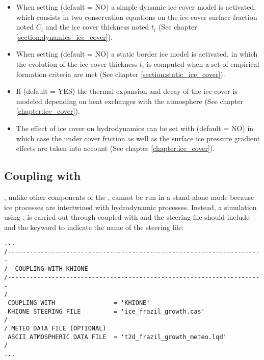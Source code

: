 \begin{itemize}
	\item When setting  (default = NO) a simple dynamic ice cover model is activated, which consists in two conservation equations on the ice cover surface fraction noted $C_i$ and the ice cover thickness noted $t_i$
(See chapter \ref{section:dynamics_ice_cover}).
    \item When setting  (default = NO) a static border ice model is activated, in which the evolution of the ice cover thickness $t_i$ is computed when a set of empirical formation criteria are met
(See chapter \ref{section:static_ice_cover}).
    \item If  (default = YES) the thermal expansion and decay of the ice cover
is modeled depending on heat exchanges with the atmosphere (See chapter \ref{chapter:ice_cover}).
    \item  The effect of ice cover on hydrodynamics can be set with  (default = NO) in which case the under cover friction as well as the surface ice pressure gradient effects are taken into account (See chapter \ref{chapter:ice_cover}).
\end{itemize}

\subsection{Coupling with }

\khione, unlike other components of the \telemacsystem{}, cannot be run in a stand-alone mode because ice processes are intertwined with hydrodynamic processes. Instead, a simulation using \khione, is carried out through  coupled
with \khione and the  steering file should include  and the keyword
 to indicate the name of the \khione steering file:

\lstset{language=TelemacCas,
        basicstyle=\scriptsize\ttfamily}
\begin{lstlisting}
...
/----------------------------------------------------------------------
/  COUPLING WITH KHIONE
/----------------------------------------------------------------------
/
 COUPLING WITH                = 'KHIONE'
 KHIONE STEERING FILE         = 'ice_frazil_growth.cas'
/
/ METEO DATA FILE (OPTIONAL)
 ASCII ATMOSPHERIC DATA FILE  = 't2d_frazil_growth_meteo.lqd'
/
...
\end{lstlisting}


